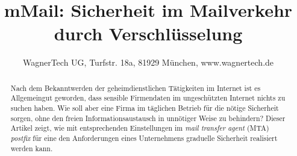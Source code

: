 \documentclass[a4paper]{scrartcl}
\title{mMail: Sicherheit im Mailverkehr durch Verschlüsselung}
\author{\normalsize{WagnerTech UG, Turfstr. 18a, 81929 München, www.wagnertech.de}}
\date{\vspace{-6ex}}
\begin{document}

\maketitle

\begin{abstract}
Nach dem Bekanntwerden der geheimdienstlichen Tätigkeiten im Internet ist es Allgemeingut geworden, dass sensible
Firmendaten im ungeschützten Internet nichts zu suchen haben. Wie soll aber eine Firma im täglichen Betrieb für
die nötige Sicherheit sorgen, ohne den freien Informationsaustausch in unnötiger Weise zu behindern? Dieser Artikel
zeigt, wie mit entsprechenden Einstellungen im \emph{mail transfer agent} (MTA) \emph{postfix} für eine den 
Anforderungen eines Unternehmens graduelle Sicherheit realisiert werden kann.
\end{abstract}
\end{document}
